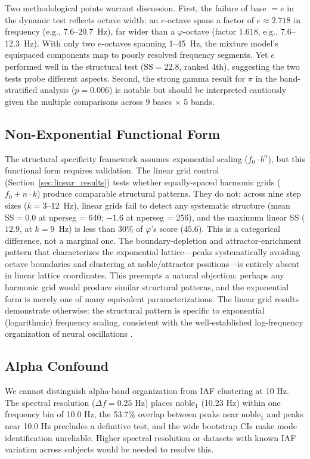 \documentclass[11pt,a4paper]{article}
\newcommand{\phisym}{\varphi}
\newcommand{\fzero}{f_0}
\begin{document}
Two methodological points warrant discussion. First, the failure of base $= e$ in the dynamic test reflects octave width: an $e$-octave spans a factor of $e \approx 2.718$ in frequency (e.g., 7.6--20.7~Hz), far wider than a $\phisym$-octave (factor 1.618, e.g., 7.6--12.3~Hz). With only two $e$-octaves spanning 1--45~Hz, the mixture model's equispaced components map to poorly resolved frequency segments. Yet $e$ performed well in the structural test ($\text{SS} = 22.8$, ranked 4th), suggesting the two tests probe different aspects. Second, the strong gamma result for $\pi$ in the band-stratified analysis ($p = 0.006$) is notable but should be interpreted cautiously given the multiple comparisons across 9 bases $\times$ 5 bands.

\subsection{Non-Exponential Functional Form}

The structural specificity framework assumes exponential scaling ($\fzero \cdot b^n$), but this functional form requires validation. The linear grid control (Section~\ref{sec:linear_results}) tests whether equally-spaced harmonic grids ($\fzero + n \cdot k$) produce comparable structural patterns. They do not: across nine step sizes ($k = 3$--$12$~Hz), linear grids fail to detect any systematic structure (mean $\text{SS} = 0.0$ at nperseg = 640; $-1.6$ at nperseg = 256), and the maximum linear SS ($12.9$, at $k = 9$~Hz) is less than 30\% of $\phisym$'s score ($45.6$). This is a categorical difference, not a marginal one. The boundary-depletion and attractor-enrichment pattern that characterizes the exponential lattice---peaks systematically avoiding octave boundaries and clustering at noble/attractor positions---is entirely absent in linear lattice coordinates. This preempts a natural objection: perhaps any harmonic grid would produce similar structural patterns, and the exponential form is merely one of many equivalent parameterizations. The linear grid results demonstrate otherwise: the structural pattern is specific to exponential (logarithmic) frequency scaling, consistent with the well-established log-frequency organization of neural oscillations \parencite{buzsaki2004neuronal}.

\subsection{Alpha Confound}

We cannot distinguish alpha-band organization from IAF clustering at 10 Hz. The spectral resolution ($\Delta f = 0.25$ Hz) places noble$_1$ (10.23 Hz) within one frequency bin of 10.0 Hz, the 53.7\% overlap between peaks near noble$_1$ and peaks near 10.0 Hz precludes a definitive test, and the wide bootstrap CIs make mode identification unreliable. Higher spectral resolution or datasets with known IAF variation across subjects would be needed to resolve this.
\end{document}
